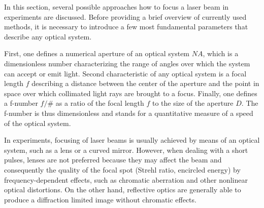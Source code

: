 In this section, several possible approaches how to focus a laser beam in experiments are discussed. Before providing a brief overview of currently used methods, it is necessary to introduce a few most fundamental parameters that describe any optical system.

First, one defines a numerical aperture of an optical system $ N\!A $, which is a dimensionless number characterizing the range of angles over which the system can accept or emit light. Second characteristic of any optical system is a focal length $ f $ describing a distance between the center of the aperture and the point in space over which collimated light rays are brought to a focus. Finally, one defines a f-number $ f/\# $ as a ratio of the focal length $ f $ to the size of the aperture $ D $. The f-number is thus dimensionless and stands for a quantitative measure of a speed of the optical system.

In experiments, focusing of laser beams is usually achieved by means of an optical system, such as a lens or a curved mirror. However, when dealing with a short pulses, lenses are not preferred because they may affect the beam and consequently the quality of the focal spot (Strehl ratio, encircled energy) by frequency-dependent effects, such as chromatic aberration and other nonlinear optical distortions. On the other hand, reflective optics are generally able to produce a diffraction limited image without chromatic effects.